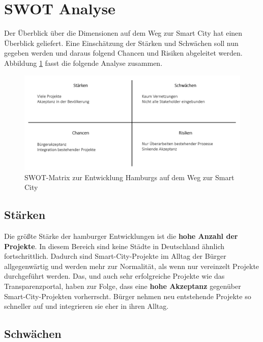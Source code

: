 \section{SWOT Analyse}
\label{sec:swot_analyse}

Der Überblick über die Dimensionen auf dem Weg zur Smart City hat einen Überblick geliefert. Eine Einschätzung der Stärken und Schwächen soll nun gegeben werden und daraus folgend Chancen und Risiken abgeleitet werden. Abbildung \ref{fig:5_swot_matrix} fasst die folgende Analyse zusammen.

\begin{figure}[h]
	\includegraphics[width=\textwidth]{graphics/5-swot-matrix}
	\caption[SWOT-Matrix zur Entwicklung Hamburgs auf dem Weg zur Smart City]{SWOT-Matrix zur Entwicklung Hamburgs auf dem Weg zur Smart City}
	\label{fig:5_swot_matrix}
\end{figure}

\subsection{Stärken}

Die größte Stärke der hamburger Entwicklungen ist die \textbf{hohe Anzahl der Projekte}. In diesem Bereich sind keine Städte in Deutschland ähnlich fortschrittlich. Dadurch sind Smart-City-Projekte im Alltag der Bürger allgegenwärtig und werden mehr zur Normalität, als wenn nur vereinzelt Projekte durchgeführt werden. Das, und auch sehr erfolgreiche Projekte wie das Transparenzportal, haben zur Folge, dass eine \textbf{hohe Akzeptanz }gegenüber Smart-City-Projekten vorherrscht. Bürger nehmen neu entstehende Projekte so schneller auf und integrieren sie eher in ihren Alltag.

\subsection{Schwächen}

